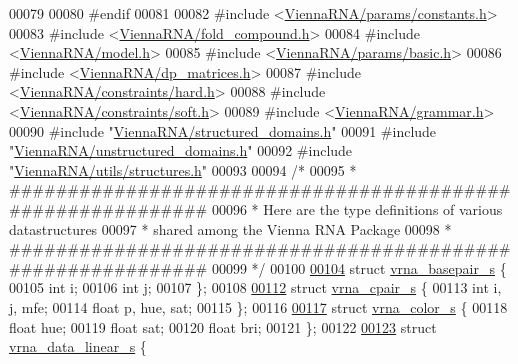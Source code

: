 \begin{DoxyCode}
00079 
00080 \textcolor{preprocessor}{#endif}
00081 
00082 \textcolor{preprocessor}{#include <\hyperlink{constants_8h}{ViennaRNA/params/constants.h}>}
00083 \textcolor{preprocessor}{#include <\hyperlink{fold__compound_8h}{ViennaRNA/fold\_compound.h}>}
00084 \textcolor{preprocessor}{#include <\hyperlink{model_8h}{ViennaRNA/model.h}>}
00085 \textcolor{preprocessor}{#include <\hyperlink{params_2basic_8h}{ViennaRNA/params/basic.h}>}
00086 \textcolor{preprocessor}{#include <\hyperlink{dp__matrices_8h}{ViennaRNA/dp\_matrices.h}>}
00087 \textcolor{preprocessor}{#include <\hyperlink{hard_8h}{ViennaRNA/constraints/hard.h}>}
00088 \textcolor{preprocessor}{#include <\hyperlink{soft_8h}{ViennaRNA/constraints/soft.h}>}
00089 \textcolor{preprocessor}{#include <\hyperlink{grammar_8h}{ViennaRNA/grammar.h}>}
00090 \textcolor{preprocessor}{#include "\hyperlink{structured__domains_8h}{ViennaRNA/structured\_domains.h}"}
00091 \textcolor{preprocessor}{#include "\hyperlink{unstructured__domains_8h}{ViennaRNA/unstructured\_domains.h}"}
00092 \textcolor{preprocessor}{#include "\hyperlink{utils_2structures_8h}{ViennaRNA/utils/structures.h}"}
00093 
00094 \textcolor{comment}{/*}
00095 \textcolor{comment}{ * ############################################################}
00096 \textcolor{comment}{ * Here are the type definitions of various datastructures}
00097 \textcolor{comment}{ * shared among the Vienna RNA Package}
00098 \textcolor{comment}{ * ############################################################}
00099 \textcolor{comment}{ */}
00100 
\hyperlink{group__data__structures}{00104} \textcolor{keyword}{struct }\hyperlink{group__data__structures_structvrna__basepair__s}{vrna\_basepair\_s} \{
00105   \textcolor{keywordtype}{int} i;
00106   \textcolor{keywordtype}{int} j;
00107 \};
00108 
\hyperlink{group__data__structures}{00112} \textcolor{keyword}{struct }\hyperlink{group__data__structures_structvrna__cpair__s}{vrna\_cpair\_s} \{
00113   \textcolor{keywordtype}{int}   i, j, mfe;
00114   \textcolor{keywordtype}{float} p, hue, sat;
00115 \};
00116 
\hyperlink{group__data__structures}{00117} \textcolor{keyword}{struct }\hyperlink{group__data__structures_structvrna__color__s}{vrna\_color\_s} \{
00118   \textcolor{keywordtype}{float} hue;
00119   \textcolor{keywordtype}{float} sat;
00120   \textcolor{keywordtype}{float} bri;
00121 \};
00122 
\hyperlink{group__data__structures}{00123} \textcolor{keyword}{struct }\hyperlink{group__data__structures_structvrna__data__linear__s}{vrna\_data\_linear\_s} \{

\end{DoxyCode}

